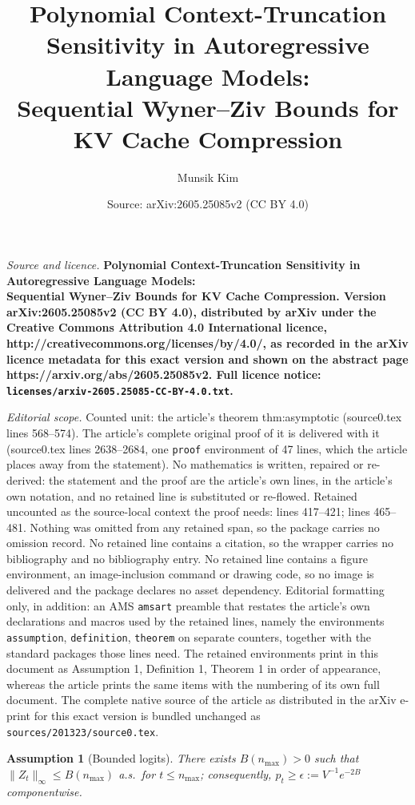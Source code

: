 \documentclass[10pt,a4paper]{amsart}
\title{\bfseries Polynomial Context-Truncation Sensitivity in Autoregressive Language Models:\\[2pt] Sequential Wyner--Ziv Bounds for KV Cache Compression}
\author{Munsik Kim}
\date{Source: arXiv:2605.25085v2 (CC BY 4.0)}
\newtheorem{assumption}{Assumption}
\begin{document}
\maketitle

\noindent\emph{Source and licence.} \bfseries Polynomial Context-Truncation Sensitivity in Autoregressive Language Models:\\[2pt] Sequential Wyner--Ziv Bounds for KV Cache Compression. Version arXiv:2605.25085v2 (CC BY 4.0), distributed by arXiv under the Creative Commons Attribution 4.0 International licence, http://creativecommons.org/licenses/by/4.0/, as recorded in the arXiv licence metadata for this exact version and shown on the abstract page https://arxiv.org/abs/2605.25085v2. Full licence notice: \texttt{licenses/arxiv-2605.25085-CC-BY-4.0.txt}.\par\smallskip

\noindent\textit{Editorial scope.} Counted unit: the article's theorem thm:asymptotic (source0.tex lines 568--574). The article's complete original proof of it is delivered with it (source0.tex lines 2638--2684, one \texttt{proof} environment of 47 lines, which the article places away from the statement). No mathematics is written, repaired or re-derived: the statement and the proof are the article's own lines, in the article's own notation, and no retained line is substituted or re-flowed.  Retained uncounted as the source-local context the proof needs: lines 417--421; lines 465--481.  Nothing was omitted from any retained span, so the package carries no omission record.  No retained line contains a citation, so the wrapper carries no bibliography and no bibliography entry.  No retained line contains a figure environment, an image-inclusion command or drawing code, so no image is delivered and the package declares no asset dependency.  Editorial formatting only, in addition: an AMS \texttt{amsart} preamble that restates the article's own declarations and macros used by the retained lines, namely the environments \texttt{assumption}, \texttt{definition}, \texttt{theorem} on separate counters, together with the standard packages those lines need.  The retained environments print in this document as Assumption 1, Definition 1, Theorem 1 in order of appearance, whereas the article prints the same items with the numbering of its own full document.  The complete native source of the article as distributed in the arXiv e-print for this exact version is bundled unchanged as \texttt{sources/201323/source0.tex}.
\begin{assumption}[Bounded logits]\label{ass:bounded-logits}
There exists $B(n_{\max}) > 0$ such that
$\|Z_t\|_\infty \leq B(n_{\max})$ a.s.\ for $t \leq n_{\max}$;
consequently, $p_t \geq \epsilon := V^{-1}e^{-2B}$ componentwise.
\end{assumption}
\end{document}

